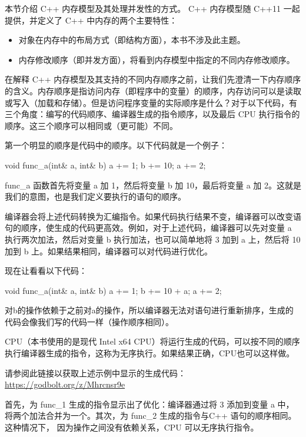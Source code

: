 
本节介绍 C++ 内存模型及其处理并发性的方式。 C++ 内存模型随 C++11 一起提供，并定义了 C++ 中内存的两个主要特性：

\begin{itemize}
\item
对象在内存中的布局方式（即结构方面），本书不涉及此主题。

\item
内存修改顺序（即并发方面），将看到内存模型中指定的不同内存修改顺序。
\end{itemize}


在解释 C++ 内存模型及其支持的不同内存顺序之前，让我们先澄清一下内存顺序的含义。内存顺序是指访问内存（即程序中的变量）的顺序，内存访问可以是读取或写入（加载和存储）。但是访问程序变量的实际顺序是什么？对于以下代码，有三个角度：编写的代码顺序、编译器生成的指令顺序，以及最后 CPU 执行指令的顺序。这三个顺序可以相同或（更可能）不同。

第一个明显的顺序是代码中的顺序。以下代码就是一个例子：

\begin{cpp}
void func_a(int& a, int& b) {
    a += 1;
    b += 10;
    a += 2;
}
\end{cpp}

func\_a 函数首先将变量 a 加 1，然后将变量 b 加 10，最后将变量 a 加 2。这就是我们的意图，也是我们定义要执行的语句的顺序。

编译器会将上述代码转换为汇编指令。如果代码执行结果不变，编译器可以改变语句的顺序，使生成的代码更高效。例如，对于上述代码，编译器可以先对变量 a 执行两次加法，然后对变量 b 执行加法，也可以简单地将 3 加到 a 上，然后将 10 加到 b 上。如果结果相同，编译器可以对代码进行优化。

现在让看看以下代码：

\begin{cpp}
void func_a(int& a, int& b) {
    a += 1;
    b += 10 + a;
    a += 2;
}
\end{cpp}

对b的操作依赖于之前对a的操作，所以编译器无法对语句进行重新排序，生成的代码会像我们写的代码一样（操作顺序相同）。

CPU（本书使用的是现代 Intel x64 CPU）将运行生成的代码，可以按不同的顺序执行编译器生成的指令，这称为无序执行。如果结果正确，CPU也可以这样做。

请参阅此链接以获取上述示例中显示的生成代码：\url{https://godbolt.org/z/Mhrcnsr9e}

首先，为 func\_1 生成的指令显示出了优化：编译器通过将 3 添加到变量 a 中，将两个加法合并为一个。其次，为 func\_2 生成的指令与C++ 语句的顺序相同。这种情况下， 因为操作之间没有依赖关系，CPU 可以无序执行指令。


